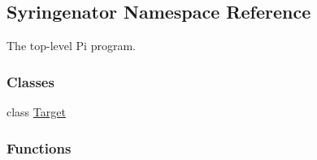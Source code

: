 \hypertarget{namespaceSyringenator}{}\subsection{Syringenator Namespace Reference}
\label{namespaceSyringenator}


The top-\/level Pi program.  


\subsubsection*{Classes}
\begin{DoxyCompactItemize}
\item 
class \mbox{\hyperlink{classSyringenator_1_1Target}{Target}}
\end{DoxyCompactItemize}
\subsubsection*{Functions}
